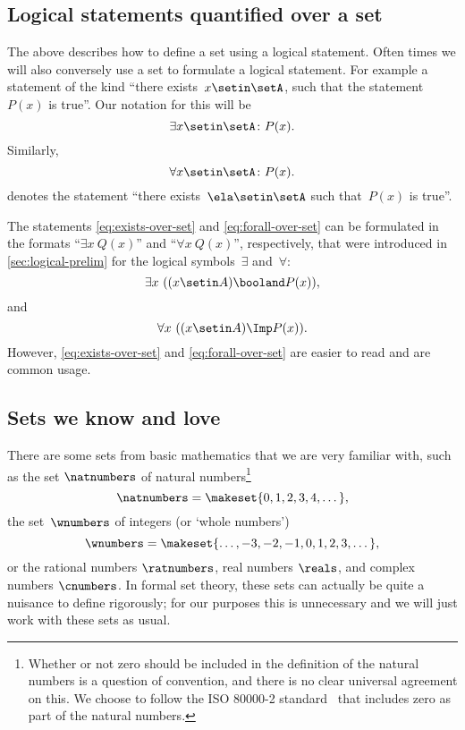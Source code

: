 \subsection{Logical statements quantified over a set}

The above describes how to define a set using a logical statement.
Often times we will also conversely use a set to formulate a logical statement.
For example a statement of the kind ``there exists~$x \setin \setA$, such that the statement~$P(x)$ is true''.
Our notation for this will be
\begin{equation}\label{eq:exists-over-set}
    \exists x \setin \setA \colon P(x).
\end{equation}
Similarly,
\begin{equation}\label{eq:forall-over-set}
    \forall x \setin \setA \colon P(x).
\end{equation}
denotes the statement ``there exists~$\ela \setin \setA$ such that~$P(x)$ is true''.

\begin{remark}
The statements \cref{eq:exists-over-set} and \cref{eq:forall-over-set}  can be formulated in the formats ``$\exists x \ Q(x)$'' and ``$\forall x \ Q(x)$'', respectively, that were introduced in \cref{sec:logical-prelim} for the logical symbols~$\exists$ and~$\forall$: 
\begin{equation}
 \exists x \  ((x \setin A) \booland P(x)),
\end{equation}
and 
\begin{equation}
 \forall x \  ((x \setin A) \Imp P(x)).
\end{equation}
However, \cref{eq:exists-over-set} and \cref{eq:forall-over-set} are easier to read and are common usage.
\end{remark}

\subsection{Sets we know and love}

There are some sets from basic mathematics that we are very familiar with, such as 
the set $\natnumbers$ of natural numbers\footnote{Whether or not zero should be included in the definition of the natural numbers is a question of convention, and there is no clear universal agreement on this.
        We choose to follow the ISO 80000-2 standard~\cite{ISO:2009:IQU} that includes zero as part of the natural numbers.
    }
    \begin{equation*}
        \natnumbers = \makeset{0, 1, 2, 3, 4, \dots },
    \end{equation*}
the set~$\wnumbers$ of integers (or `whole numbers')
    \begin{equation*}
        \wnumbers = \makeset{ \dots, -3, -2, -1, 0, 1, 2, 3, \dots },
    \end{equation*}
or the rational numbers $\ratnumbers$, real numbers $\reals$, and complex numbers $\cnumbers$. 
In formal set theory, these sets can actually be quite a nuisance to define rigorously; for our purposes this is unnecessary and we will just work with these sets as usual. 
